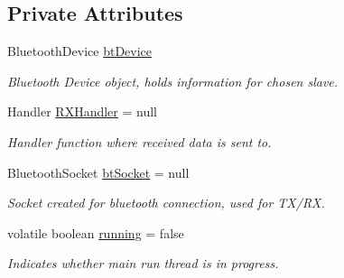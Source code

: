 \subsection*{Private Attributes}
\begin{DoxyCompactItemize}
\item 
\mbox{\label{class_android_app_1_1_b_t_connection_a3ed1e51b0f24f0b20ca5c27270f2999c}} 
Bluetooth\+Device \hyperlink{class_android_app_1_1_b_t_connection_a3ed1e51b0f24f0b20ca5c27270f2999c}{bt\+Device}
\begin{DoxyCompactList}\small\item\em Bluetooth Device object, holds information for chosen slave. \end{DoxyCompactList}\item 
\mbox{\label{class_android_app_1_1_b_t_connection_a4e3bfea96a4ddbd2cd2b76bb4ce8b871}} 
Handler \hyperlink{class_android_app_1_1_b_t_connection_a4e3bfea96a4ddbd2cd2b76bb4ce8b871}{R\+X\+Handler} = null
\begin{DoxyCompactList}\small\item\em Handler function where received data is sent to. \end{DoxyCompactList}\item 
\mbox{\label{class_android_app_1_1_b_t_connection_af3cdc6c880b28361d87d0118ace0e49c}} 
Bluetooth\+Socket \hyperlink{class_android_app_1_1_b_t_connection_af3cdc6c880b28361d87d0118ace0e49c}{bt\+Socket} = null
\begin{DoxyCompactList}\small\item\em Socket created for bluetooth connection, used for T\+X/\+RX. \end{DoxyCompactList}\item 
\mbox{\label{class_android_app_1_1_b_t_connection_ace01a7a97f5d1abccb61a5d6c6ad9295}} 
volatile boolean \hyperlink{class_android_app_1_1_b_t_connection_ace01a7a97f5d1abccb61a5d6c6ad9295}{running} = false
\begin{DoxyCompactList}\small\item\em Indicates whether main run thread is in progress. \end{DoxyCompactList}\end{DoxyCompactItemize}
